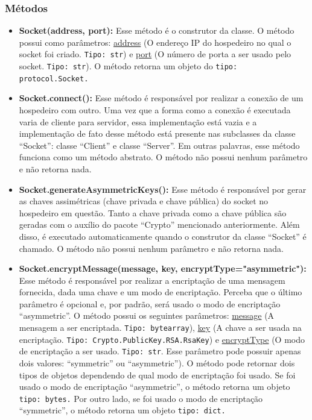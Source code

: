\documentclass[10pt]{article}
\begin{document}
\begin{itemize}
        \subsubsection{\large Métodos}
            \begin{itemize}
            \item \textbf{Socket(address, port):} Esse método é o construtor da classe. O método possui como parâmetros: \underline{address} (O endereço IP do hospedeiro no qual o socket foi criado. \texttt{Tipo: str}) e \underline{port} (O número de porta a ser usado pelo socket. \texttt{Tipo: str}). O método retorna um objeto do \texttt{tipo: protocol.Socket.}
            \item \textbf{Socket.connect():} Esse método é responsável por realizar a conexão de um hospedeiro
            com outro. Uma vez que a forma como a conexão é executada varia de cliente para servidor, essa implementação está vazia e a implementação de fato desse método está presente nas subclasses da classe “Socket”: classe “Client” e classe “Server”. Em outras palavras, esse método funciona como um método abstrato. O método não possui nenhum parâmetro e não retorna nada.
            \item \textbf{Socket.generateAsymmetricKeys():} Esse método é responsável por gerar as chaves assimétricas (chave privada e chave pública) do socket no hospedeiro em questão. Tanto a chave privada como a chave pública são geradas com o auxílio do pacote “Crypto” mencionado anteriormente. Além disso, é executado automaticamente quando o construtor da classe “Socket” é chamado. O método não possui nenhum parâmetro e não retorna nada.
            \item \textbf{Socket.encryptMessage(message, key, encryptType="asymmetric"):} Esse \newline método é responsável por realizar a encriptação de uma mensagem fornecida, dada uma chave e um modo de encriptação. Perceba que o último parâmetro é opcional e, por padrão, será usado o modo de encriptação “asymmetric”. O método possui os seguintes parâmetros: \underline{message} (A mensagem a ser encriptada. \texttt{Tipo: bytearray}), \underline{key} (A chave a ser usada na encriptação. \texttt{Tipo: Crypto.PublicKey.RSA.RsaKey}) e \underline{encryptType} (O modo de encriptação a ser usado. \texttt{Tipo: str}. Esse parâmetro pode possuir apenas dois valores: “symmetric” ou “asymmetric”). O método pode retornar dois tipos de objetos dependendo de qual modo de encriptação foi usado. Se foi usado o modo de encriptação “asymmetric”, o método retorna um objeto \texttt{tipo: bytes.} Por outro lado, se foi usado o modo de encriptação “symmetric”, o método retorna um objeto \texttt{tipo: dict.}

\end{itemize}
\end{itemize}
\end{document}
